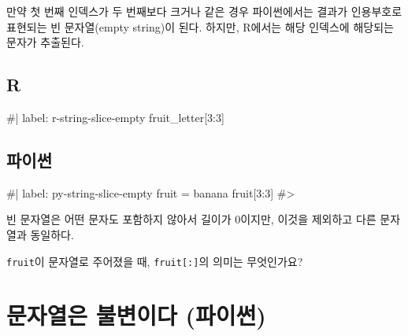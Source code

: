 \documentclass[
  letterpaper,
]{book}
\newenvironment{Shaded}{\begin{snugshade}}{\end{snugshade}}
\newcommand{\NormalTok}[1]{\textcolor[rgb]{0.00,0.23,0.31}{#1}}
\begin{document}
만약 첫 번째 인덱스가 두 번째보다 크거나 같은 경우 파이썬에서는 결과가
인용부호로 표현되는 빈 문자열(empty string)이 된다. 하지만, R에서는 해당
인덱스에 해당되는 문자가 추출된다. 

\subsection{R}

\begin{Shaded}
\begin{Highlighting}[]
\NormalTok{\#| label: r{-}string{-}slice{-}empty}
\NormalTok{fruit\_letter[3:3]}
\end{Highlighting}
\end{Shaded}

\subsection{파이썬}

\begin{Shaded}
\begin{Highlighting}[]
\NormalTok{\#| label: py{-}string{-}slice{-}empty}
\NormalTok{fruit = \textquotesingle{}banana\textquotesingle{}}
\NormalTok{fruit[3:3]}
\NormalTok{\#\textgreater{} \textquotesingle{}\textquotesingle{}}
\end{Highlighting}
\end{Shaded}

빈 문자열은 어떤 문자도 포함하지 않아서 길이가 0이지만, 이것을 제외하고
다른 문자열과 동일하다.  

\begin{tcolorbox}[enhanced jigsaw, coltitle=black, breakable, opacityback=0, colback=white, bottomtitle=1mm, titlerule=0mm, toptitle=1mm, title=\textcolor{quarto-callout-warning-color}{\faExclamationTriangle}\hspace{0.5em}{연습문제 (파이썬)}, left=2mm, rightrule=.15mm, colframe=quarto-callout-warning-color-frame, bottomrule=.15mm, leftrule=.75mm, toprule=.15mm, arc=.35mm, colbacktitle=quarto-callout-warning-color!10!white, opacitybacktitle=0.6]

\texttt{fruit}이 문자열로 주어졌을 때, \texttt{fruit{[}:{]}}의 의미는
무엇인가요?

\end{tcolorbox}

\section{문자열은 불변이다
(파이썬)}\label{uxbb38uxc790uxc5f4uxc740-uxbd88uxbcc0uxc774uxb2e4-uxd30cuxc774uxc36c}
\end{document}

